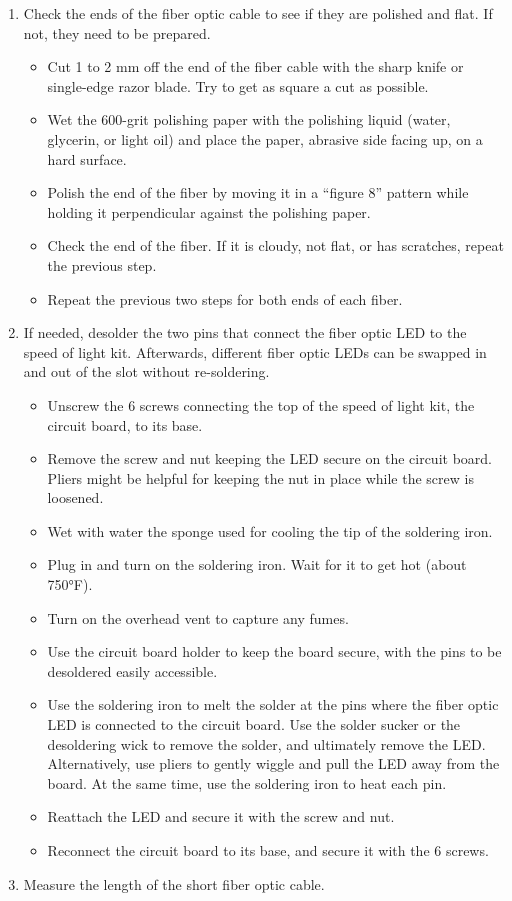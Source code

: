\documentclass[12pt]{iopart} %
\begin{document}
\begin{enumerate}
\def\labelenumi{\arabic{enumi}.}
\item
  Check the ends of the fiber optic cable to see if they are polished
  and flat. If not, they need to be prepared.

  \begin{itemize}
  \item
    Cut 1 to 2 mm off the end of the fiber cable with the sharp knife or
    single-edge razor blade. Try to get as square a cut as possible.
  \item
    Wet the 600-grit polishing paper with the polishing liquid (water,
    glycerin, or light oil) and place the paper, abrasive side facing
    up, on a hard surface.
  \item
    Polish the end of the fiber by moving it in a ``figure 8'' pattern
    while holding it perpendicular against the polishing paper.
  \item
    Check the end of the fiber. If it is cloudy, not flat, or has
    scratches, repeat the previous step.
  \item
    Repeat the previous two steps for both ends of each fiber.
  \end{itemize}
\item
  If needed, desolder the two pins that connect the fiber optic LED to
  the speed of light kit. Afterwards, different fiber optic LEDs can be
  swapped in and out of the slot without re-soldering.

  \begin{itemize}
  \item
    Unscrew the 6 screws connecting the top of the speed of light kit,
    the circuit board, to its base.
  \item
    Remove the screw and nut keeping the LED secure on the circuit
    board. Pliers might be helpful for keeping the nut in place while
    the screw is loosened.
  \item
    Wet with water the sponge used for cooling the tip of the soldering
    iron.
  \item
    Plug in and turn on the soldering iron. Wait for it to get hot
    (about 750°F).
  \item
    Turn on the overhead vent to capture any fumes.
  \item
    Use the circuit board holder to keep the board secure, with the pins
    to be desoldered easily accessible.
  \item
    Use the soldering iron to melt the solder at the pins where the
    fiber optic LED is connected to the circuit board. Use the solder
    sucker or the desoldering wick to remove the solder, and ultimately
    remove the LED. Alternatively, use pliers to gently wiggle and pull
    the LED away from the board. At the same time, use the soldering
    iron to heat each pin.
  \item
    Reattach the LED and secure it with the screw and nut.
  \item
    Reconnect the circuit board to its base, and secure it with the 6
    screws.
  \end{itemize}
\item
  Measure the length of the short fiber optic cable.


\end{enumerate}
\end{document}
